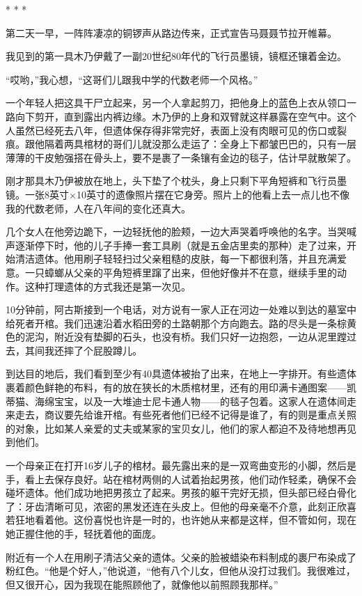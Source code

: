 \documentclass[12pt,oneside]{book}
\begin{document}
\begin{bookref}[frametitle={\cite{好好告别}}]
\begin{center}
* * *
\end{center}

第二天一早，一阵阵凄凉的铜锣声从路边传来，正式宣告马聂聂节拉开帷幕。

我见到的第一具木乃伊戴了一副20世纪80年代的飞行员墨镜，镜框还镶着金边。

“哎哟，”我心想，“这哥们儿跟我中学的代数老师一个风格。”

一个年轻人把这具干尸立起来，另一个人拿起剪刀，把他身上的蓝色上衣从领口一路向下剪开，直到露出内裤边缘。木乃伊的上身和双臂就这样暴露在空气中。这个人虽然已经死去八年，但遗体保存得非常完好，表面上没有肉眼可见的伤口或裂痕。跟他隔着两具棺材的哥们儿就没那么走运了：全身上下都皱巴巴的，只有一层薄薄的干皮勉强搭在骨头上，要不是裹了一条镶有金边的毯子，估计早就散架了。

刚才那具木乃伊被放在地上，头下垫了个枕头，身上只剩下平角短裤和飞行员墨镜。一张8英寸×10英寸的遗像照片摆在它身旁。照片上的他看上去一点儿也不像我的代数老师，人在八年间的变化还真大。

几个女人在他旁边跪下，一边轻抚他的脸颊，一边大声哭着呼唤他的名字。当哭喊声逐渐停下时，他的儿子手捧一套工具刷（就是五金店里卖的那种）走了过来，开始清洁遗体。他用刷子轻轻扫过父亲粗糙的皮肤，每一下都很利落，并且充满爱意。一只蟑螂从父亲的平角短裤里蹿了出来，但他好像并不在意，继续手里的动作。这种打理遗体的方式我还是第一次见。

10分钟前，阿古斯接到一个电话，对方说有一家人正在河边一处难以到达的墓室中给死者开棺。我们迅速沿着水稻田旁的土路朝那个方向跑去。路的尽头是一条棕黄色的泥沟，附近没有垫脚的石头，也没有桥。我们只好一边抱怨，一边从泥里蹚过去，其间我还摔了个屁股蹲儿。

到达目的地后，我们看到至少有40具遗体被抬了出来，在地上一字排开。有些遗体裹着颜色鲜艳的布料，有的放在狭长的木质棺材里，还有的用印满卡通图案——凯蒂猫、海绵宝宝，以及一大堆迪士尼卡通人物——的毯子包着。这家人在遗体间走来走去，商议要先给谁开棺。有些死者他们已经不记得是谁了，有的则是重点关照的对象，比如某人亲爱的丈夫或某家的宝贝女儿，他们的家人都迫不及待地想再见到他们。

一个母亲正在打开16岁儿子的棺材。最先露出来的是一双弯曲变形的小脚，然后是手，看上去保存良好。站在棺材两侧的人试着抬起男孩，他们动作轻柔，确保不会碰坏遗体。他们成功地把男孩立了起来。男孩的躯干完好无损，但头部已经白骨化了：牙齿清晰可见，浓密的黑发还连在头皮上。但他的母亲毫不介意，此刻正欣喜若狂地看着他。这份喜悦也许是一时的，也许她从来都是这样，但不管如何，现在她正握住他的手，轻抚着他的面庞。

附近有一个人在用刷子清洁父亲的遗体。父亲的脸被蜡染布料制成的裹尸布染成了粉红色。“他是个好人，”他说道，“他有八个儿女，但他从没打过我们。我很难过，但又很开心，因为我现在能照顾他了，就像他以前照顾我那样。”


\end{bookref}
\end{document}
